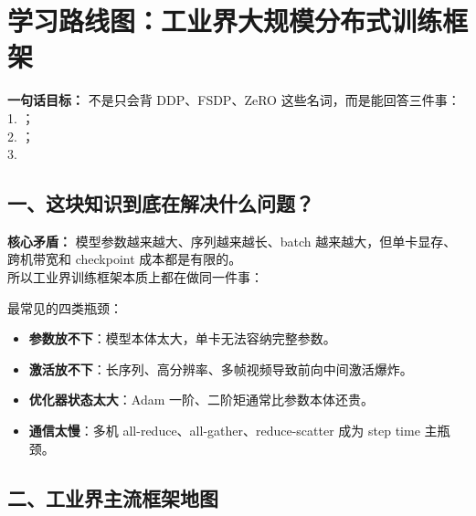 
\section{学习路线图：工业界大规模分布式训练框架}

\begin{conceptbox}
\textbf{一句话目标：} 不是只会背 DDP、FSDP、ZeRO 这些名词，而是能回答三件事：\\
1. ；\\
2. ；\\
3. 
\end{conceptbox}

\subsection{一、这块知识到底在解决什么问题？}

\begin{warnbox}
\textbf{核心矛盾：} 模型参数越来越大、序列越来越长、batch 越来越大，但单卡显存、跨机带宽和 checkpoint 成本都是有限的。\\
所以工业界训练框架本质上都在做同一件事：
\end{warnbox}

最常见的四类瓶颈：
\begin{itemize}[leftmargin=1.5em]
  \item \textbf{参数放不下}：模型本体太大，单卡无法容纳完整参数。
  \item \textbf{激活放不下}：长序列、高分辨率、多帧视频导致前向中间激活爆炸。
  \item \textbf{优化器状态太大}：Adam 一阶、二阶矩通常比参数本体还贵。
  \item \textbf{通信太慢}：多机 all-reduce、all-gather、reduce-scatter 成为 step time 主瓶颈。
\end{itemize}

\subsection{二、工业界主流框架地图}

